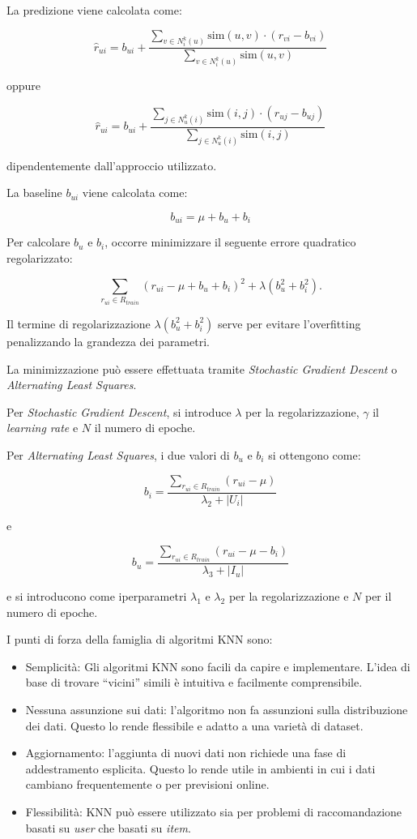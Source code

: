La predizione viene calcolata come:

\[
\hat{r}_{ui} = b_{ui} + \frac{\sum_{v \in N^k_i(u)} \text{sim}(u, v) \cdot (r_{vi} - b_{vi})}{\sum_{v \in N^k_i(u)} \text{sim}(u, v)}
\]

oppure

\[
\hat{r}_{ui} = b_{ui} + \frac{\sum_{j \in N^k_u(i)} \text{sim}(i, j) \cdot (r_{uj} - b_{uj})}{\sum_{j \in N^k_u(i)} \text{sim}(i, j)}
\]

dipendentemente dall'approccio utilizzato.

La baseline \(b_{ui}\) viene calcolata come:

\[
b_{ui} = \mu + b_u + b_i
\]

Per calcolare \(b_u\) e \(b_i\), occorre minimizzare il seguente errore quadratico regolarizzato:

\[
\sum_{r_{ui} \in R_{train}} \left(r_{ui} - \mu + b_u + b_i\right)^2 + \lambda \left(b_u^2 + b_i^2 \right).
\]

Il termine di regolarizzazione \(\lambda \left(b_u^2 + b_i^2 \right)\) serve per evitare l'overfitting penalizzando la grandezza dei parametri.

La minimizzazione può essere effettuata tramite \emph{Stochastic Gradient Descent} o \emph{Alternating Least Squares}.

Per \emph{Stochastic Gradient Descent}, si introduce \(\lambda\) per la regolarizzazione, \(\gamma\) il \emph{learning rate} e \(N\) il numero di epoche.

Per \emph{Alternating Least Squares}, i due valori di \(b_u\) e \(b_i\) si ottengono come:

\[
b_i = \frac{\sum_{r_{ui} \in R_{train}} (r_{ui} - \mu)}{\lambda_2 + |U_i|}
\]

e

\[
b_u = \frac{\sum_{r_{ui} \in R_{train}} (r_{ui} - \mu - b_i)}{\lambda_3 + |I_u|}
\]

e si introducono come iperparametri \(\lambda_1\) e \(\lambda_2\) per la regolarizzazione e \(N\) per il numero di epoche.

I punti di forza della famiglia di algoritmi KNN sono:
\begin{itemize}
    \item Semplicità: Gli algoritmi KNN sono facili da capire e implementare. L'idea di base di trovare ``vicini'' simili è intuitiva e facilmente comprensibile.
    \item Nessuna assunzione sui dati: l'algoritmo non fa assunzioni sulla distribuzione dei dati. Questo lo rende flessibile e adatto a una varietà di dataset.
    \item Aggiornamento: l'aggiunta di nuovi dati non richiede una fase di addestramento esplicita. Questo lo rende utile in ambienti in cui i dati cambiano frequentemente o per previsioni online.
    \item Flessibilità: KNN può essere utilizzato sia per problemi di raccomandazione basati su \emph{user} che basati su \emph{item}.
\end{itemize}

